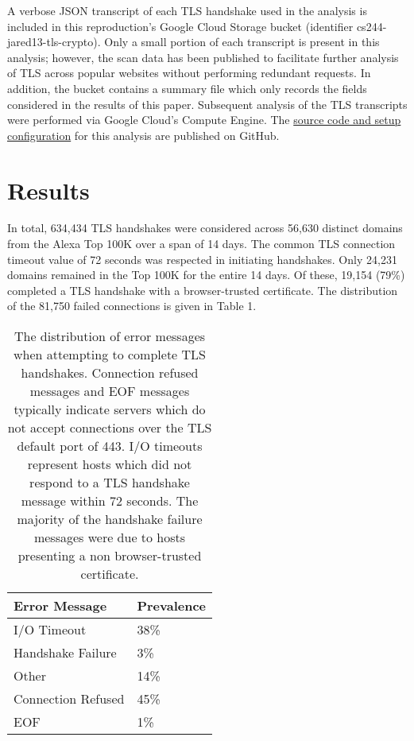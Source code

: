 A verbose JSON transcript of each TLS handshake used in the analysis is included in this reproduction's Google Cloud Storage bucket (identifier cs244-jared13-tls-crypto). Only a small portion of each transcript is present in this analysis; however, the scan data has been published to facilitate further analysis of TLS across popular websites without performing redundant requests. In addition, the bucket contains a summary file which only records the fields considered in the results of this paper. Subsequent analysis of the TLS transcripts were performed via Google Cloud's Compute Engine. The \href{https://github.com/jmcrawford45/cs244-final-project}{source code and setup configuration} for this analysis are published on GitHub.

\section{Results}
 
In total, 634,434 TLS handshakes were considered across 56,630 distinct domains from the Alexa Top 100K over a span of 14 days.  The common TLS connection timeout value of 72 seconds was respected in initiating handshakes. Only 24,231 domains remained in the Top 100K for the entire 14 days. Of these, 19,154 (79\%) completed a TLS handshake with a browser-trusted certificate. The distribution of the 81,750 failed connections is given in Table 1.

\begin{table}[]
\centering
\caption{The distribution of error messages when attempting to complete TLS handshakes. Connection refused messages and EOF messages typically indicate servers which do not accept connections over the TLS default port of 443. I/O timeouts represent hosts which did not respond to a TLS handshake message within 72 seconds. The majority of the handshake failure messages were due to hosts presenting a non browser-trusted certificate.}
\label{my-label}
\begin{tabular}{|l|l|}
\hline
\textbf{Error Message} & \textbf{Prevalence} \\ \hline
I/O Timeout            & 38\%                 \\ \hline
Handshake Failure      & 3\%                 \\ \hline
Other                  & 14\%                 \\ \hline
Connection Refused     & 45\%                 \\ \hline
EOF                    & 1\%                 \\ \hline
\end{tabular}
\end{table}

